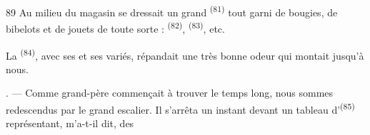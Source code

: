 \begin{VUpage}[91]{89}
\VUblancAlinea
Au milieu du magasin se dressait un grand \nl
{}\textsuperscript{(81)} tout garni de bougies, de bibelots et de\nl
jouets de toute sorte : \textsuperscript{(82)}, \cc
{}\textsuperscript{(83)}, etc.

\VUblancAlinea
La \textsuperscript{(84)}, avec ses \nl
et ses  variés, répandait une très bonne\nl
odeur qui montait jusqu'à nous.

. --- Comme grand-père commençait à trouver le\nl
temps long, nous sommes redescendus par le grand\nl
escalier. Il s'arrêta un instant devant un tableau\nl
d'\textsuperscript{(85)} représentant, m'a-t-il dit, des
\parplein
\end{VUpage}

